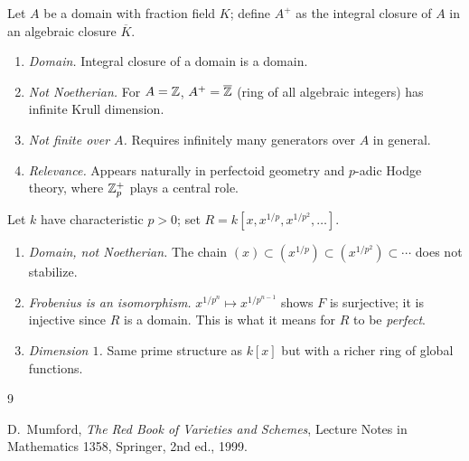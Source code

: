\documentclass[a4paper, 12pt]{article}
\begin{document}

\begin{example}
Let $A$ be a domain with fraction field $K$; define $A^+$ as the integral closure
of $A$ in an algebraic closure $\overline K$.
\leavevmode\begin{enumerate}
\item \emph{Domain.} Integral closure of a domain is a domain.
\item \emph{Not Noetherian.} For $A = \mathbb{Z}$, $A^+ = \overline{\mathbb{Z}}$ (ring of all
  algebraic integers) has infinite Krull dimension.
\item \emph{Not finite over $A$.} Requires infinitely many generators over $A$
  in general.
\item \emph{Relevance.} Appears naturally in perfectoid geometry and $p$-adic
  Hodge theory, where $\mathbb{Z}^+_p$ plays a central role.
\end{enumerate}
\end{example}


\begin{example}[{$R = k[x^{1/p^\infty}]$, perfection in characteristic $p$}]
Let $k$ have characteristic $p > 0$; set
$R = k[x, x^{1/p}, x^{1/p^2}, \ldots]$.
\leavevmode\begin{enumerate}
\item \emph{Domain, not Noetherian.} The chain
  $(x) \subset (x^{1/p}) \subset (x^{1/p^2}) \subset \cdots$
  does not stabilize.
\item \emph{Frobenius is an isomorphism.} $x^{1/p^n} \mapsto x^{1/p^{n-1}}$
  shows $F$ is surjective; it is injective since $R$ is a domain.
  This is what it means for $R$ to be \emph{perfect}.
\item \emph{Dimension $1$.} Same prime structure as $k[x]$ but with a
  richer ring of global functions.
\end{enumerate}
\end{example}



\begin{thebibliography}{9}

  D.~Mumford,
  \emph{The Red Book of Varieties and Schemes},
  Lecture Notes in Mathematics 1358,
  Springer, 2nd ed., 1999.

\end{thebibliography}
\end{document}
